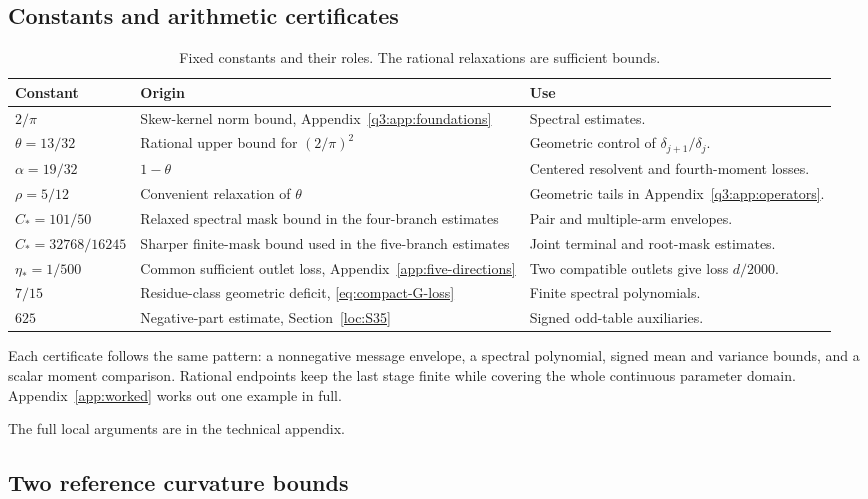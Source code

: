 \subsection{Constants and arithmetic certificates}\label{sec:certificate-scope}
\begin{table}[htbp]\centering\small
\caption{Fixed constants and their roles. The rational relaxations are sufficient bounds.}\label{tab:constants}
\begin{tabular}{@{}p{26mm}p{55mm}p{65mm}@{}}\toprule
Constant & Origin & Use\\\midrule
$2/\pi$ & Skew-kernel norm bound, Appendix~\ref{q3:app:foundations} & Spectral estimates.\\
$\theta=13/32$ & Rational upper bound for $(2/\pi)^2$ & Geometric control of $\delta_{j+1}/\delta_j$.\\
$\alpha=19/32$ & $1-\theta$ & Centered resolvent and fourth-moment losses.\\
$\rho=5/12$ & Convenient relaxation of $\theta$ & Geometric tails in Appendix~\ref{q3:app:operators}.\\
$C_*=101/50$ & Relaxed spectral mask bound in the four-branch estimates & Pair and multiple-arm envelopes.\\
$C_*=32768/16245$ & Sharper finite-mask bound used in the five-branch estimates & Joint terminal and root-mask estimates.\\
$\eta_*=1/500$ & Common sufficient outlet loss, Appendix~\ref{app:five-directions} & Two compatible outlets give loss $d/2000$.\\
$7/15$ & Residue-class geometric deficit, \eqref{eq:compact-G-loss} & Finite spectral polynomials.\\
$625$ & Negative-part estimate, Section~\ref{loc:S35} & Signed odd-table auxiliaries.\\\bottomrule
\end{tabular}
\end{table}
Each certificate follows the same pattern: a nonnegative message
envelope, a spectral polynomial, signed mean and variance bounds, and a
scalar moment comparison. Rational endpoints keep the last stage finite
while covering the whole continuous parameter domain.
Appendix~\ref{app:worked} works out one example in full.


The full local arguments are in the technical appendix.



\subsection{Two reference curvature bounds}
\label{sec:reference-curvature-nine}

